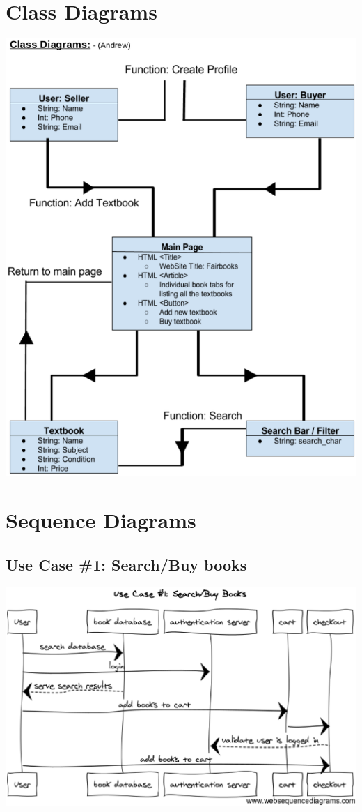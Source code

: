 \documentclass[12pt]{article}
\begin{document}
	\section{Class Diagrams}

	\includegraphics[width=14cm]{class_diagrams.eps}



	\section{Sequence Diagrams}

		\subsection{Use Case \#1: Search/Buy books}
		\includegraphics[width=14cm]{sequence_diagram1.eps}
\end{document}
